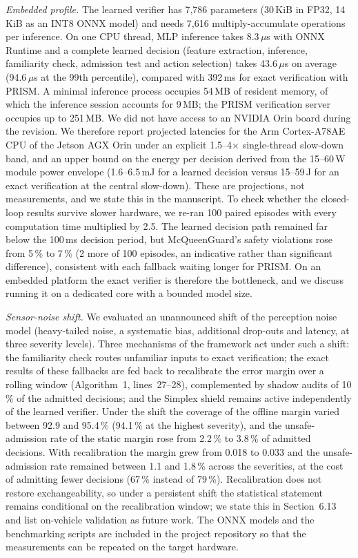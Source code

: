 \documentclass[11pt]{article}
\begin{document}
\emph{Embedded profile.} The learned verifier has 7,786 parameters (30\,KiB in
FP32, 14\,KiB as an INT8 ONNX model) and needs 7,616 multiply-accumulate
operations per inference. On one CPU thread, MLP inference takes 8.3\,$\mu$s with ONNX Runtime and
a complete learned decision (feature extraction, inference, familiarity check, admission test and action selection) takes
43.6\,$\mu$s on average (94.6\,$\mu$s at the 99th percentile), compared with 392\,ms for exact
verification with PRISM. A minimal inference process occupies 54\,MB of resident memory,
of which the inference session accounts for 9\,MB; the PRISM verification
server occupies up to 251\,MB. We did not have access to an NVIDIA Orin board during the
revision. We therefore report projected latencies for the Arm Cortex-A78AE CPU of the Jetson AGX Orin under an explicit
1.5--4$\times$ single-thread slow-down band, and an upper bound on the energy per decision derived from the 15--60\,W module
power envelope (1.6--6.5\,mJ for a
learned decision versus 15--59\,J for an exact
verification at the central slow-down). These are projections, not measurements, and we state this in the manuscript. To check
whether the closed-loop results survive slower hardware, we re-ran 100 paired episodes with every computation time
multiplied by 2.5. The learned decision path remained far below the 100\,ms decision period, but McQueenGuard's safety
violations rose from 5\,\% to 7\,\%
(2 more of 100 episodes, an indicative rather than significant
difference), consistent with each fallback waiting longer for PRISM. On an embedded platform the exact verifier is therefore the bottleneck, and we
discuss running it on a dedicated core with a bounded model size.

\emph{Sensor-noise shift.} We evaluated an unannounced shift of the perception noise model (heavy-tailed noise, a systematic
bias, additional drop-outs and latency, at three severity levels). Three mechanisms of the framework act under such a shift:
the familiarity check routes unfamiliar inputs to exact verification; the exact results of these fallbacks are fed back to
recalibrate the error margin over a rolling window (Algorithm~1, lines~27--28), complemented by shadow audits of 10\,\% of the
admitted decisions; and the Simplex shield remains active independently of the learned verifier. Under the shift the
coverage of the offline margin varied between 92.9 and 95.4\,\%
(94.1\,\% at the highest severity), and the unsafe-admission rate of the static margin rose from 2.2\,\% to
3.8\,\% of admitted decisions. With recalibration the margin grew from
0.018 to 0.033 and the unsafe-admission rate remained between
1.1 and 1.8\,\% across the severities, at the cost of admitting fewer decisions
(67\,\% instead of 79\,\%).
Recalibration does not restore exchangeability, so under a persistent shift the statistical statement remains conditional on the
recalibration window; we state this in Section~6.13 and list on-vehicle validation as future work. The ONNX models and the
benchmarking scripts are included in the project repository so that the measurements can be repeated on the target hardware.
\end{document}
